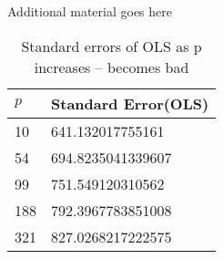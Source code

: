Additional material goes here
% 




\begin{table}[h!]
\renewcommand{\arraystretch}{1.5}
\centering
\begin{tabular}{||l l||} 
 \hline
 \hline
 $p$ & Standard Error(OLS) \\ [0.5ex] 
 \hline\hline
 10 & 641.132017755161 \\ 
 54 & 694.8235041339607  \\
 99 & 751.549120310562 \\ 
 188 & 792.3967783851008 \\ 
 321 & 827.0268217222575 \\[1ex] 
 \hline
\end{tabular}
\caption{Standard errors of OLS as p increases -- becomes bad }
\label{table:1}
\end{table}

